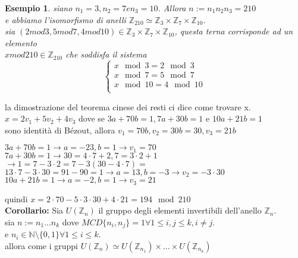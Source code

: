 \documentclass[a4paper,12pt]{article}
\theoremstyle{def}
\theoremstyle{prop}
\theoremstyle{esempio}
\newtheorem*{example}{Esempio}
\theoremstyle{dimostrazione}
\theoremstyle{teo}
\theoremstyle{osservazione}
\begin{document}
\begin{example}
	siano \(n_1 = 3, n_2 = 7 e n_3 = 10\). Allora \(n := n_1 n_2 n_3 = 210\)\\
	e abbiamo l'isomorfismo di anelli \(\mathbb{Z}_{210} \simeq \mathbb{Z}_3 \times \mathbb{Z}_7 \times \mathbb{Z}_{10}\).\\
	sia \((2 mod 3, 5 mod 7, 4 mod 10) \in \mathbb{Z}_3 \times \mathbb{Z}_7 \times \mathbb{Z}_{10}\), questa terna corrisponde ad un elemento\\
	\(x mod 210 \in \mathbb{Z}_{210}\) che soddisfa il sistema
	\[
		\begin{cases}
			x\mod 3 = 2\mod 3   \\
			x\mod 7 = 5\mod 7   \\
			x\mod 10 = 4\mod 10 \\
		\end{cases}
	\]
\end{example}

la dimostrazione del teorema cinese dei resti ci dice come trovare x.\\
\(x = 2 v_1 + 5 v_2 + 4 v_3\) dove se \(3 a + 70 b = 1, 7 a + 30 b = 1\) e \(10 a + 21 b = 1\)\\
sono identità di Bézout, allora \(v_1 = 70 b, v_2 = 30 b  = 30, v_3 = 21 b\)\\
\begin{center}
	\(3 a + 70 b = 1 \rightarrow a = -23, b = 1 \rightarrow v_1 = 70\)\\
	\(7 a + 30 b = 1 \rightarrow 30 = 4 \cdot 7 + 2 , 7 = 3 \cdot 2 + 1\)\\
	\(\rightarrow 1 = 7 - 3 \cdot 2 = 7 - 3(30 - 4 \cdot 7) = \)\\
	\(13 \cdot 7 - 3 \cdot 30 = 91 - 90 = 1 \rightarrow a = 13, b = -3 \rightarrow v_2 = -3 \cdot 30\)\\
	\(10 a + 21 b = 1 \rightarrow a = -2, b = 1 \rightarrow v_3 = 21\)\\
\end{center}

quindi \(x = 2 \cdot 70 - 5 \cdot 3 \cdot 30 + 4 \cdot 21 = 194\mod 210\)\\

\textbf{Corollario:} Sia \(U(\mathbb{Z}_n)\) il gruppo degli elementi invertibili dell'anello \(\mathbb{Z}_n\).\\
sia \(n := n_1 ... n_k\) dove \(MCD\{n_i, n_j\} = 1 \forall 1 \leq i,j \leq k, i \neq j\).\\
e \(n_i \in \mathbb{N} \setminus \{0,1\} \forall 1 \leq i \leq k\).\\
allora come i gruppi \(U(\mathbb{Z}_n) \simeq U(\mathbb{Z}_{n_1}) \times ... \times U(\mathbb{Z}_{n_k})\)
\end{document}
